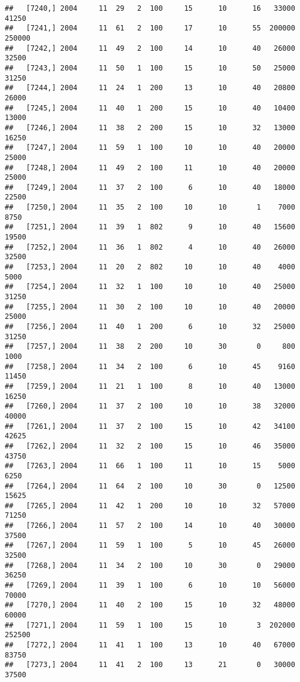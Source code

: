 \documentclass{article}\usepackage[]{graphicx}\usepackage[]{color}
\makeatletter
\newenvironment{kframe}{%
 \def\at@end@of@kframe{}%
 \ifinner\ifhmode%
  \def\at@end@of@kframe{\end{minipage}}%
  \begin{minipage}{\columnwidth}%
 \fi\fi%
 \def\FrameCommand##1{\hskip\@totalleftmargin \hskip-\fboxsep
 \colorbox{shadecolor}{##1}\hskip-\fboxsep
     \hskip-\linewidth \hskip-\@totalleftmargin \hskip\columnwidth}%
 \MakeFramed {\advance\hsize-\width
   \@totalleftmargin\z@ \linewidth\hsize
   \@setminipage}}%
 {\par\unskip\endMakeFramed%
 \at@end@of@kframe}
\newenvironment{knitrout}{}{} %
\makeatother
\begin{document}
\begin{knitrout}
\begin{kframe}
\begin{verbatim}
##   [7240,] 2004     11  29   2  100     15      10      16   33000   41250
##   [7241,] 2004     11  61   2  100     17      10      55  200000  250000
##   [7242,] 2004     11  49   2  100     14      10      40   26000   32500
##   [7243,] 2004     11  50   1  100     15      10      50   25000   31250
##   [7244,] 2004     11  24   1  200     13      10      40   20800   26000
##   [7245,] 2004     11  40   1  200     15      10      40   10400   13000
##   [7246,] 2004     11  38   2  200     15      10      32   13000   16250
##   [7247,] 2004     11  59   1  100     10      10      40   20000   25000
##   [7248,] 2004     11  49   2  100     11      10      40   20000   25000
##   [7249,] 2004     11  37   2  100      6      10      40   18000   22500
##   [7250,] 2004     11  35   2  100     10      10       1    7000    8750
##   [7251,] 2004     11  39   1  802      9      10      40   15600   19500
##   [7252,] 2004     11  36   1  802      4      10      40   26000   32500
##   [7253,] 2004     11  20   2  802     10      10      40    4000    5000
##   [7254,] 2004     11  32   1  100     10      10      40   25000   31250
##   [7255,] 2004     11  30   2  100     10      10      40   20000   25000
##   [7256,] 2004     11  40   1  200      6      10      32   25000   31250
##   [7257,] 2004     11  38   2  200     10      30       0     800    1000
##   [7258,] 2004     11  34   2  100      6      10      45    9160   11450
##   [7259,] 2004     11  21   1  100      8      10      40   13000   16250
##   [7260,] 2004     11  37   2  100     10      10      38   32000   40000
##   [7261,] 2004     11  37   2  100     15      10      42   34100   42625
##   [7262,] 2004     11  32   2  100     15      10      46   35000   43750
##   [7263,] 2004     11  66   1  100     11      10      15    5000    6250
##   [7264,] 2004     11  64   2  100     10      30       0   12500   15625
##   [7265,] 2004     11  42   1  200     10      10      32   57000   71250
##   [7266,] 2004     11  57   2  100     14      10      40   30000   37500
##   [7267,] 2004     11  59   1  100      5      10      45   26000   32500
##   [7268,] 2004     11  34   2  100     10      30       0   29000   36250
##   [7269,] 2004     11  39   1  100      6      10      10   56000   70000
##   [7270,] 2004     11  40   2  100     15      10      32   48000   60000
##   [7271,] 2004     11  59   1  100     15      10       3  202000  252500
##   [7272,] 2004     11  41   1  100     13      10      40   67000   83750
##   [7273,] 2004     11  41   2  100     13      21       0   30000   37500

\end{verbatim}
\end{kframe}
\end{knitrout}
\end{document}
